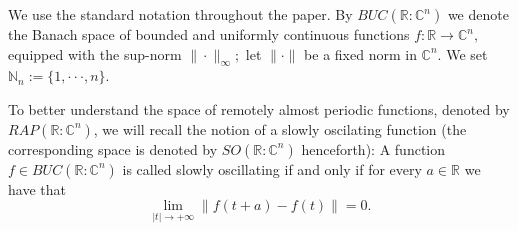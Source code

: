 \documentclass[english,reqno]{amsart}
\numberwithin{equation}{section}
\theoremstyle{plain}
\theoremstyle{definition}
\theoremstyle{remark}
\begin{document}

We use the standard notation throughout the paper.
By $BUC({\mathbb R } : {\mathbb C }^{n})$ we denote the Banach space of bounded and uniformly continuous functions $f : {\mathbb R } \rightarrow {\mathbb C }^{n},$ 
equipped with the sup-norm $\| \cdot \|_{\infty};$ let $\| \cdot \|$ be a fixed norm in ${\mathbb C}^{n}.$ We set ${\mathbb N}_{n}:=\{1,\cdot \cdot \cdot, n\}.$

To better understand the space of remotely almost periodic functions, denoted by $RAP({\mathbb R } : {\mathbb C }^{n})$, we will recall the notion of a slowly oscilating function (the corresponding space is denoted by $SO({\mathbb R } : {\mathbb C }^{n})$ henceforth):
A function $f\in BUC({\mathbb R } : {\mathbb C }^{n})$ is called slowly oscillating if and only if for every $a\in {\mathbb R}$ we have that
$$
\lim_{|t|\rightarrow +\infty}\| f(t+a)-f(t)\|=0.
$$
\end{document}
